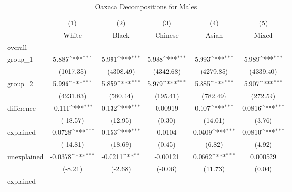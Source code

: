 \begin{table}[htbp]\centering
\def\sym#1{\ifmmode^{#1}\else\(^{#1}\)\fi}
\caption{Oaxaca Decompositions for Males\label{tab1}}
\begin{tabular}{l*{5}{c}}
\hline\hline
            &\multicolumn{1}{c}{(1)}&\multicolumn{1}{c}{(2)}&\multicolumn{1}{c}{(3)}&\multicolumn{1}{c}{(4)}&\multicolumn{1}{c}{(5)}\\
            &\multicolumn{1}{c}{White}&\multicolumn{1}{c}{Black}&\multicolumn{1}{c}{Chinese}&\multicolumn{1}{c}{Asian}&\multicolumn{1}{c}{Mixed}\\
\hline
overall     &                     &                     &                     &                     &                     \\
group\_1     &       5.885\sym{***}&       5.991\sym{***}&       5.988\sym{***}&       5.993\sym{***}&       5.989\sym{***}\\
            &   (1017.35)         &   (4308.49)         &   (4342.68)         &   (4279.85)         &   (4339.40)         \\
group\_2     &       5.996\sym{***}&       5.859\sym{***}&       5.979\sym{***}&       5.885\sym{***}&       5.907\sym{***}\\
            &   (4231.83)         &    (580.44)         &    (195.41)         &    (782.49)         &    (272.59)         \\
difference  &      -0.111\sym{***}&       0.132\sym{***}&     0.00919         &       0.107\sym{***}&      0.0816\sym{***}\\
            &    (-18.57)         &     (12.95)         &      (0.30)         &     (14.01)         &      (3.76)         \\
explained   &     -0.0728\sym{***}&       0.153\sym{***}&      0.0104         &      0.0409\sym{***}&      0.0810\sym{***}\\
            &    (-14.81)         &     (18.69)         &      (0.45)         &      (6.82)         &      (4.92)         \\
unexplained &     -0.0378\sym{***}&     -0.0211\sym{**} &    -0.00121         &      0.0662\sym{***}&    0.000529         \\
            &     (-8.21)         &     (-2.68)         &     (-0.06)         &     (11.73)         &      (0.04)         \\
\hline
explained   &                     &                     &                     &                     &                     \\

\end{tabular}
\end{table}

